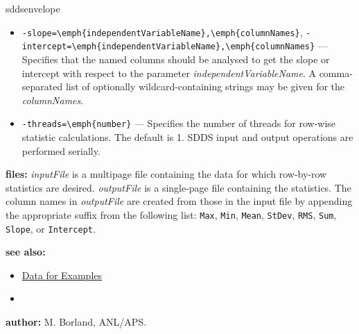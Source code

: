 \begin{sddsprog}{sddsenvelope}
\begin{itemize}
    \item \verb|-slope=\emph{independentVariableName},\emph{columnNames}|, \verb|-intercept=\emph{independentVariableName},\emph{columnNames}| --- Specifies that the named columns should be analysed to get the slope or intercept with respect to the parameter \emph{independentVariableName}. A comma-separated list of optionally wildcard-containing strings may be given for the \emph{columnNames}.
    \item \verb|-threads=\emph{number}| --- Specifies the number of threads for row-wise statistic calculations. The default is 1. SDDS input and output operations are performed serially.
  \end{itemize}
  \item \textbf{files:} \emph{inputFile} is a multipage file containing the data for which row-by-row statistics are desired. \emph{outputFile} is a single-page file containing the statistics. The column names in \emph{outputFile} are created from those in the input file by appending the appropriate suffix from the following list: {\tt Max}, {\tt Min}, {\tt Mean}, {\tt StDev}, {\tt RMS}, {\tt Sum}, {\tt Slope}, or {\tt Intercept}.
  \item \textbf{see also:}
  \begin{itemize}
    \item \hyperref[exampleData]{Data for Examples}
    \item {}
  \end{itemize}
  \item \textbf{author:} M. Borland, ANL/APS.
\end{sddsprog}
